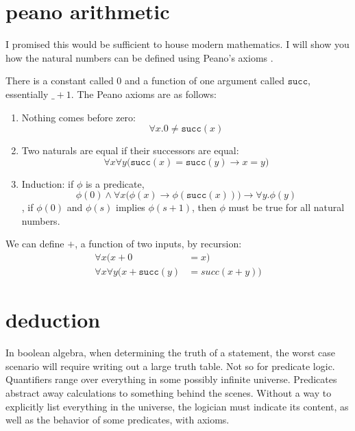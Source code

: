 \message{ !name(truth.tex)}\documentclass{scrbook}
\renewcommand{\implies}{\to}
\begin{document}
\section[Peano Arithmetic]{peano arithmetic}
I promised this would be sufficient to house modern mathematics. I will show you how the natural numbers can be defined using Peano's axioms \cite{wiki:peano}. 

\renewcommand{\succ}{\texttt{succ}}
\begin{defn}
  There is a constant called $0$ and a function of one argument called
  $\succ$, essentially $\_+1$.  The Peano axioms are as follows:
  \begin{enumerate}
  \item Nothing comes before zero:
    \[
    \label{peano:0}
    \forall x. 0 \neq \succ(x)
    \]
  \item Two naturals are equal if their successors are equal:
    \[
    \label{peano:succ}
    \forall x\forall y\bigl( \succ (x) = \succ(y) \implies x=y\bigr)
    \]
  \item Induction: if $\phi$ is a predicate,
    \[
    \label{peano:ind}
    \phi(0) \wedge \forall x \bigl(\phi(x)\implies
    \phi(\succ(x))\bigr) \implies \forall y.\phi(y)
    \]
    \ie, if $\phi(0)$ and $\phi(s)$ implies $\phi(s+1)$, then
    $\phi$ must be true for all natural numbers.
  \end{enumerate}
\end{defn}

\begin{defn}[plus]
  \label{defn:peano:+}
  We can define $+$, a function of two inputs, by recursion:
  \begin{align*}
    \forall x (x + 0 &= x) \\
    \forall x \forall y \bigl(x + \succ(y) &= succ(x+y)\bigr)
  \end{align*}
\end{defn}
\section[Deduction]{deduction}
In boolean algebra, when determining the truth of a statement, the worst case scenario will require writing out a large truth table. Not so for predicate logic. Quantifiers range over everything in some possibly infinite universe. Predicates abstract away calculations to something behind the scenes. Without a way to explicitly list everything in the universe, the logician must indicate its content, as well as the behavior of some predicates, with axioms.  
\end{document}
